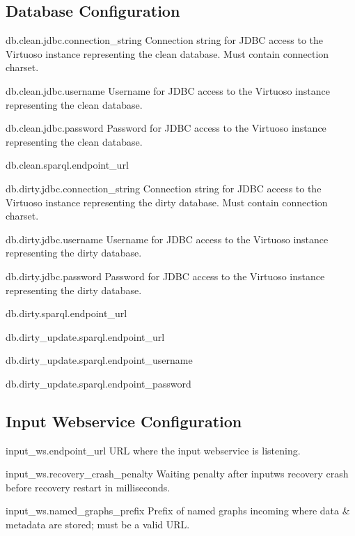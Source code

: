 \subsection*{Database Configuration}
\begin{configlist}
	\item[db.clean.jdbc.connection\_string]
	  Connection string for JDBC access to the Virtuoso instance representing the clean database. Must contain connection charset.
	\item[db.clean.jdbc.username]
	  Username for JDBC access to the Virtuoso instance representing the clean database.
	\item[db.clean.jdbc.password]
	  Password for JDBC access to the Virtuoso instance representing the clean database.
	\item[db.clean.sparql.endpoint\_url]

	\item[db.dirty.jdbc.connection\_string]
		Connection string for JDBC access to the Virtuoso instance representing the dirty database. Must contain connection charset.
	\item[db.dirty.jdbc.username]
		Username for JDBC access to the Virtuoso instance representing the dirty database.
	\item[db.dirty.jdbc.password]
		Password for JDBC access to the Virtuoso instance representing the dirty database.
	\item[db.dirty.sparql.endpoint\_url]
	\item[db.dirty\_update.sparql.endpoint\_url]
	\item[db.dirty\_update.sparql.endpoint\_username]
	\item[db.dirty\_update.sparql.endpoint\_password]
\end{configlist}

\subsection*{Input Webservice Configuration}
\begin{configlist}
	\item[input\_ws.endpoint\_url]
		URL where the input webservice is listening.
	\item[input\_ws.recovery\_crash\_penalty]
		Waiting penalty after inputws recovery crash before recovery restart in milliseconds.
	\item[input\_ws.named\_graphs\_prefix]
		Prefix of named graphs incoming where data & metadata are stored; must be a valid URL.
\end{configlist}

